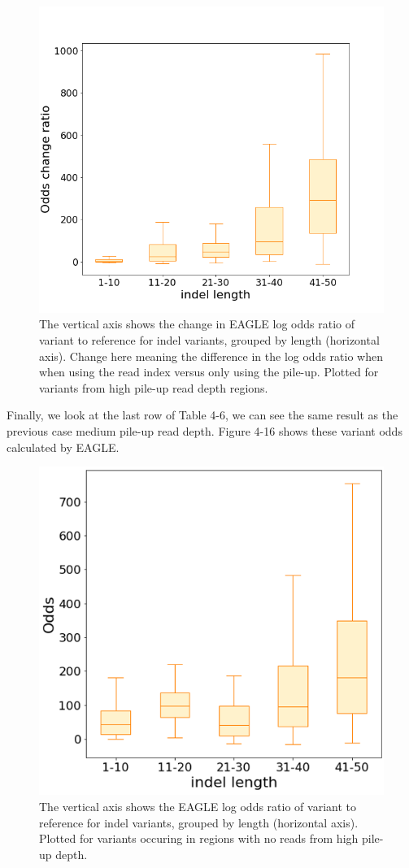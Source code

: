 \begin{figure}[H]
    \centering
    \includegraphics[width=0.6\columnwidth]{body/image/hi_odds_change.png}
    \captionsetup{labelfont=bf}
    \renewcommand{\baselinestretch}{1.0}
    \caption[high pile-up read depth odds change ratio]{The vertical axis shows the change in EAGLE log odds ratio of variant to reference for indel variants, grouped by length (horizontal axis).  Change here meaning the difference in the log odds ratio when when using the read index versus only using the pile-up.  Plotted for variants from high pile-up read depth regions.}
    \label{hi_odds_change}
\end{figure}

Finally, we look at the last row of Table 4-6, we can see the same result as the previous case medium pile-up read depth. Figure 4-16 shows these variant odds calculated by EAGLE.

\begin{figure}[H]
    \centering
    \includegraphics[width=0.6\columnwidth]{body/image/hi_new_odds.png}
    \captionsetup{labelfont=bf}
    \renewcommand{\baselinestretch}{1.0}
    \caption[no reads with variants from high pile-up depth odds ratio]{The vertical axis shows the EAGLE log odds ratio of variant to reference for indel variants, grouped by length (horizontal axis).  Plotted for variants occuring in regions with no reads from high pile-up depth.}
    \label{hi_new_odds}
\end{figure}


